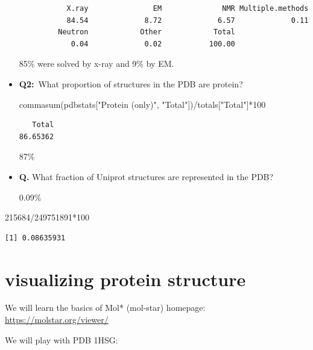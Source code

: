 \documentclass[
  letterpaper,
  DIV=11,
  numbers=noendperiod]{scrartcl}
\newenvironment{Shaded}{\begin{snugshade}}{\end{snugshade}}
\newcommand{\DecValTok}[1]{\textcolor[rgb]{0.68,0.00,0.00}{#1}}
\newcommand{\FunctionTok}[1]{\textcolor[rgb]{0.28,0.35,0.67}{#1}}
\newcommand{\NormalTok}[1]{\textcolor[rgb]{0.00,0.23,0.31}{#1}}
\newcommand{\SpecialCharTok}[1]{\textcolor[rgb]{0.37,0.37,0.37}{#1}}
\newcommand{\StringTok}[1]{\textcolor[rgb]{0.13,0.47,0.30}{#1}}
\begin{document}
\begin{itemize}
\begin{verbatim}
           X.ray               EM              NMR Multiple.methods 
           84.54             8.72             6.57             0.11 
         Neutron            Other            Total 
            0.04             0.02           100.00 
\end{verbatim}

  85\% were solved by x-ray and 9\% by EM.
\item
  \textbf{Q2:}~What proportion of structures in the PDB are protein?

\begin{Shaded}
\begin{Highlighting}[]
\FunctionTok{commasum}\NormalTok{(pdbstats[}\StringTok{"Protein (only)"}\NormalTok{, }\StringTok{"Total"}\NormalTok{])}\SpecialCharTok{/}\NormalTok{totals[}\StringTok{"Total"}\NormalTok{]}\SpecialCharTok{*}\DecValTok{100}
\end{Highlighting}
\end{Shaded}

\begin{verbatim}
   Total 
86.65362 
\end{verbatim}

  87\%
\item
  \textbf{Q.} What fraction of Uniprot structures are represented in the
  PDB?

  0.09\%
\end{itemize}

\begin{Shaded}
\begin{Highlighting}[]
\DecValTok{215684}\SpecialCharTok{/}\DecValTok{249751891}\SpecialCharTok{*}\DecValTok{100}
\end{Highlighting}
\end{Shaded}

\begin{verbatim}
[1] 0.08635931
\end{verbatim}

\hypertarget{visualizing-protein-structure}{%
\section{visualizing protein
structure}\label{visualizing-protein-structure}}

We will learn the basics of Mol* (mol-star) homepage:
\url{https://molstar.org/viewer/}

We will play with PDB 1HSG:
\end{document}
